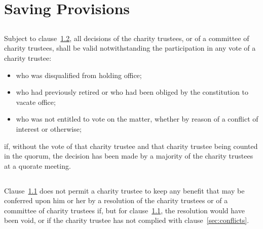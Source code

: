 \section{Saving Provisions}\label{sec:saving}

    \subsection{}\label{sec:invalid_voters}
    Subject to clause~\ref{sec:invalid_benefits}, all decisions of the charity trustees, or of a committee of charity trustees, shall be valid notwithstanding the participation in any vote of a charity trustee:
    \begin{itemize}
        \item who was disqualified from holding office;
        \item who had previously retired or who had been obliged by the constitution to vacate office;
        \item who was not entitled to vote on the matter, whether by reason of a conflict of interest or otherwise;
    \end{itemize}
    if, without the vote of that charity trustee and that charity trustee being counted in the quorum, the decision has been made by a majority of the charity trustees at a quorate meeting.

    \subsection{}\label{sec:invalid_benefits}
    Clause~\ref{sec:invalid_voters} does not permit a charity trustee to keep any benefit that may be conferred upon him or her by a resolution of the charity trustees or of a committee of charity trustees if, but for clause~\ref{sec:invalid_voters}, the resolution would have been void, or if the charity trustee has not complied with clause~\ref{sec:conflicts}.
